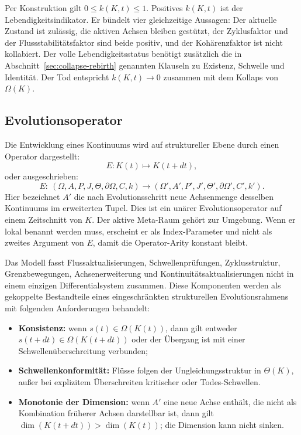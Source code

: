 Per Konstruktion gilt \(0 \le k(K,t) \le 1\).
Positives \(k(K,t)\) ist der Lebendigkeitsindikator. Er bündelt vier
gleichzeitige Aussagen: Der aktuelle Zustand ist zulässig, die aktiven Achsen
bleiben gestützt, der Zyklusfaktor und der Flussstabilitätsfaktor sind beide
positiv, und der Kohärenzfaktor ist nicht kollabiert. Der volle Lebendigkeitsstatus
benötigt zusätzlich die in Abschnitt~\ref{sec:collapse-rebirth} genannten Klauseln
zu Existenz, Schwelle und Identität.
Der Tod entspricht \(k(K,t)\to 0\) zusammen mit dem Kollaps von
\(\Omega(K)\).

\subsection{Evolutionsoperator}

Die Entwicklung eines Kontinuums wird auf struktureller Ebene durch einen Operator
dargestellt:
\[
    E: K(t) \mapsto K(t+dt),
\]
oder ausgeschrieben:
\[
    E:\ (\Omega,A,P,J,\Theta,\partial\Omega,C,k)
    \longrightarrow (\Omega',A',P',J',\Theta',\partial\Omega',C',k').
\]
Hier bezeichnet \(A'\) die nach Evolutionsschritt neue Achsenmenge desselben
Kontinuums im erweiterten Tupel.
Dies ist ein unärer Evolutionsoperator auf einem Zeitschnitt von \(K\). Der aktive
Meta-Raum gehört zur Umgebung. Wenn er lokal benannt werden muss, erscheint er als
Index-Parameter und nicht als zweites Argument von \(E\), damit die
Operator-Arity konstant bleibt.

Das Modell fasst Flussaktualisierungen, Schwellenprüfungen, Zyklusstruktur,
Grenzbewegungen, Achsenerweiterung und Kontinuitätsaktualisierungen nicht in
einem einzigen Differentialsystem zusammen. Diese Komponenten werden als
gekoppelte Bestandteile eines eingeschränkten strukturellen Evolutionsrahmens mit
folgenden Anforderungen behandelt:

\begin{itemize}
    \item \textbf{Konsistenz:} wenn \(s(t) \in \Omega(K(t))\), dann gilt entweder
          \(s(t+dt) \in \Omega(K(t+dt))\) oder der Übergang ist mit einer
          Schwellenüberschreitung verbunden;
    \item \textbf{Schwellenkonformität:} Flüsse folgen der Ungleichungsstruktur
          in \(\Theta(K)\), außer bei explizitem Überschreiten kritischer
          oder Todes-Schwellen.
    \item \textbf{Monotonie der Dimension:} wenn \(A'\) eine neue Achse enthält,
die nicht als Kombination früherer Achsen darstellbar ist, dann gilt
          \(\dim(K(t+dt)) > \dim(K(t))\); die Dimension kann nicht sinken.
\end{itemize}

